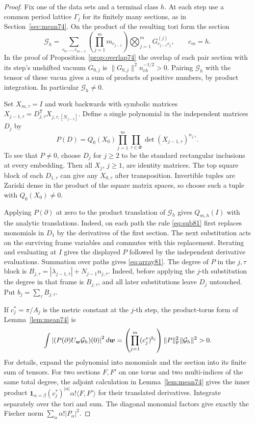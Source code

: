 \documentclass[a4paper,11pt]{article}
\theoremstyle{definition}
\theoremstyle{remark}
\numberwithin{equation}{section}
\begin{document}
\begin{proof}
Fix one of the data sets and a terminal class \(h\). At each step
use a common period lattice \(\Gamma_j\) for its finitely many
sections, as in Section~\ref{sec:mean74}. On the product of the
resulting tori form the section
\[
 {\mathcal G}_h=
   \sum_{c_0,\ldots,c_{m-1}}
   \left(\prod_{j=1}^m m_{c_{j-1}}\right)
   \bigotimes_{j=1}^m G^{(j)}_{c_{j-1}c_j},\qquad c_m=h.
\]
In the proof of Proposition~\ref{prop:overlap74} the overlap of
each pair section with its step's unshifted vacuum \(G_{0,j}\)
is \(\|G_{0,j}\|^2 n_{ch}^{-1/2}>0\). Pairing \({\mathcal G}_h\)
with the tensor of these vacua gives a sum of products of positive
numbers, by product integration. In particular \({\mathcal G}_h\ne0\).

Set \(X_{m,\tau}=I\) and work backwards with symbolic matrices
\(X_{j-1,\tau}=D_{j,\tau}^{\mathsf T}X_{j,\tau,[N_{j-1}]}\).
Define a single polynomial in the independent matrices \(D_j\) by
\[
 P(D)=Q_0(X_0)\prod_{j=1}^m\prod_{\tau\in\Phi}
                         \det(X_{j-1,\tau})^{n_{j,\tau}} .
\]
To see that \(P\ne0\), choose \(D_j\) for \(j\ge2\) to be the
standard rectangular inclusions at every embedding. Then all
\(X_j\), \(j\ge1\), are identity matrices. The top square block
of each \(D_{1,\tau}\) can give any \(X_{0,\tau}\) after transposition.
Invertible tuples are Zariski dense in the product of the square
matrix spaces, so choose such a tuple with \(Q_0(X_0)\ne0\).

Applying \(P(\partial)\) at zero to the product translation of
\({\mathcal G}_h\) gives \(Q_{m,h}(I)\) with the analytic translations.
Indeed, on each path the rule \eqref{eq:sub81} first replaces
monomials in \(D_1\) by the derivatives of the first section.
The next substitution acts on the surviving frame variables and
commutes with this replacement. Iterating and evaluating at \(I\)
gives the displayed \(P\) followed by the independent derivative
evaluations. Summation over paths gives \eqref{eq:array81}.
The degree of \(P\) in the \(j,\tau\) block is
\(B_{j,\tau}=|\lambda_{j-1,\tau}|+N_{j-1}n_{j,\tau}\). Indeed,
before applying the \(j\)-th substitution the degree in that frame
is \(B_{j,\tau}\), and all later substitutions leave \(D_j\)
untouched. Put \(b_j=\sum_\tau B_{j,\tau}\).

If \(c_j^*=\pi/A_j\) is the metric constant at the \(j\)-th step,
the product-torus form of Lemma~\ref{lem:mean74} is
\begin{equation}
 \int\left|(P(\partial) U_{\boldsymbol w}{\mathcal G}_h)(0)\right|^2
                 d\boldsymbol w
     =\left(\prod_{j=1}^m(c_j^*)^{b_j}\right)
                    \|P\|_{\rm F}^2\|{\mathcal G}_h\|^2>0. \label{eq:avg81}
\end{equation}
For details, expand the polynomial into monomials and the section
into its finite sum of tensors. For two sections \(F,F'\) on one
torus and two multi-indices of the same total degree, the adjoint
calculation in Lemma~\ref{lem:mean74} gives the inner product
\(\mathbf1_{\alpha=\beta}(c_j^*)^{|\alpha|}\alpha!
\langle F,F'\rangle\) for their translated derivatives. Integrate
separately over the tori and sum. The diagonal monomial factors
give exactly the Fischer norm \(\sum_\alpha\alpha!|P_\alpha|^2\).


\end{proof}
\end{document}
